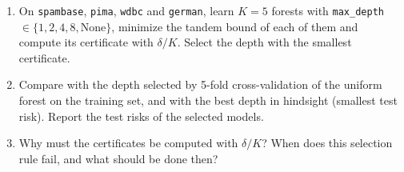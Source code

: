\documentclass[11pt]{article}
\newcommand{\code}[1]{\texttt{#1}}
\begin{document}
\begin{enumerate}
\item On \code{spambase}, \code{pima}, \code{wdbc} and \code{german}, learn $K=5$ forests with \code{max\_depth}
      $\in\{1,2,4,8,\text{None}\}$, minimize the tandem bound of each of them and compute its certificate with $\delta/K$.
      Select the depth with the smallest certificate.
\item Compare with the depth selected by 5-fold cross-validation of the uniform forest on the training set, and
      with the best depth in hindsight (smallest test risk). Report the test risks of the selected models.
\item Why must the certificates be computed with $\delta/K$? When does this selection rule fail, and what should be
      done then?
\end{enumerate}
\end{document}
